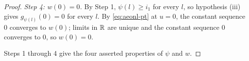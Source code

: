 \begin{proof}
\emph{Step 4: $w(0)=0$.}
By Step 1, $\psi(l)\ge i_1$ for every $l$, so hypothesis (iii) gives
$g_{\psi(l)}(0)=0$ for every $l$. By \eqref{eq:aeonl-pt} at $u=0$, the constant
sequence $0$ converges to $w(0)$; limits in $\mathbb{R}$ are unique and the constant
sequence $0$ converges to $0$, so $w(0)=0$.

Steps 1 through 4 give the four asserted properties of $\psi$ and $w$.
\end{proof}
